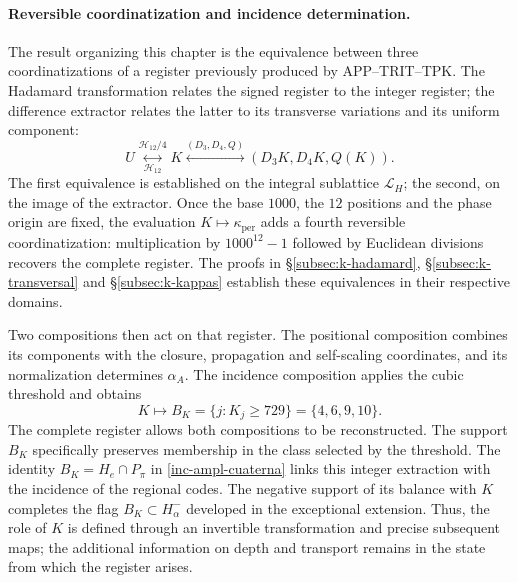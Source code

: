 \paragraph{Reversible coordinatization and incidence determination.}
\label{ampl-alfa-k-intro-reversible}
The result organizing this chapter is the equivalence between three
coordinatizations of a register previously produced by
APP--TRIT--TPK. The Hadamard transformation relates the signed
register to the integer register; the difference extractor relates
the latter to its transverse variations and its uniform component:
\[
 U\underset{\mathcal H_{12}}{\overset{\mathcal H_{12}/4}{\longleftrightarrow}}K
 \overset{(D_3,D_4,Q)}{\longleftrightarrow}
 (D_3K,D_4K,Q(K)).
\]
The first equivalence is established on the integral sublattice
$\mathcal L_H$; the second, on the image of the extractor. Once the
base $1000$, the $12$ positions and the phase origin are fixed, the evaluation
$K\mapsto\kappa_{\mathrm{per}}$ adds a fourth reversible
coordinatization: multiplication by $1000^{12}-1$ followed by Euclidean
divisions recovers the complete register. The proofs in
\S\ref{subsec:k-hadamard}, \S\ref{subsec:k-transversal} and
\S\ref{subsec:k-kappas} establish these equivalences in their respective
domains.

Two compositions then act on that register. The positional
composition combines its components with the closure,
propagation and self-scaling coordinates, and its normalization determines $\alpha_A$. The
incidence composition applies the cubic threshold and obtains
\[
 K\longmapsto B_K=\{j:K_j\geq729\}=\{4,6,9,10\}.
\]
The complete register allows both compositions to be reconstructed. The support
$B_K$ specifically preserves membership in the class selected
by the threshold. The identity $B_K=H_e\cap P_\pi$ in
\eqref{inc-ampl-cuaterna} links this integer extraction with the incidence
of the regional codes. The negative support of its balance with $K$
completes the flag $B_K\subset H^-_\alpha$ developed in the
exceptional extension. Thus, the role of $K$ is defined through
an invertible transformation and precise subsequent maps;
the additional information on depth and transport remains
in the state from which the register arises.
